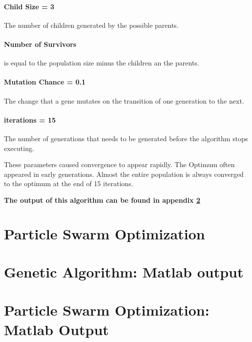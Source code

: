 \documentclass[10pt,a4paper]{article}
\begin{document}
\paragraph{Child Size = 3} The number of children generated by the possible parents.
\paragraph{Number of Survivors} is equal to the population size minus the children an the parents.
\paragraph{Mutation Chance = 0.1} The change that a gene mutates on the transition of one generation to the next.
\paragraph{iterations = 15} The number of generations that needs to be generated before the algorithm stops executing.

\bigskip

\noindent These parameters caused convergence to appear rapidly. The Optimum often appeared in early generations. Almost the entire population is always converged to the optimum at the end of 15 iterations.

\medskip

\noindent \textbf{The output of this algorithm can be found in appendix \ref{sec:genMatlab}}
\section{Particle Swarm Optimization}
\appendix
\section{Genetic Algorithm: Matlab output}
\label{sec:genMatlab}

\section{Particle Swarm Optimization: Matlab Output}
\end{document}
